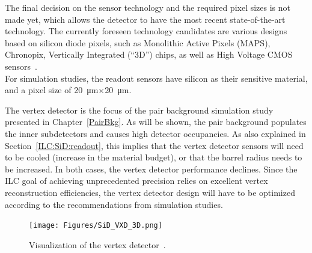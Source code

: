 The final decision on the \sid sensor technology and the required pixel sizes is not made yet, which allows the detector to have the most recent state-of-the-art technology.
The currently foreseen technology candidates are various designs based on silicon diode pixels, such as Monolithic Active Pixels (MAPS), Chronopix, Vertically Integrated (``3D'') chips, as well as High Voltage CMOS sensors~\cites[p. 70 ff]{TDR4}[p. 319 ff]{spieler}. 
\\For simulation studies, the readout sensors have silicon as their sensitive material, and a pixel size of \SI{20}{\micro\meter}$\times$\SI{20}{\micro\meter}.

The vertex detector is the focus of the \positron\electron pair background simulation study presented in Chapter~\ref{PairBkg}.
As will be shown, the pair background populates the inner subdetectors and causes high detector occupancies.
As also explained in Section~\ref{ILC:SiD:readout}, this implies that the vertex detector sensors will need to be cooled (increase in the material budget), or that the barrel radius needs to be increased. 
In both cases, the vertex detector performance declines.
Since the ILC goal of achieving unprecedented precision relies on excellent vertex reconstruction efficiencies, the vertex detector design will have to be optimized according to the recommendations from simulation studies.
\begin{figure}[h!]
\centering
\texttt{[image: Figures/SiD\_VXD\_3D.png]}
\caption[Visualization of the \sid vertex detector]{Visualization of the \sid vertex detector~\cite{SiD_Update2}.}
\label{fig:SiD_VXD}
\end{figure}

